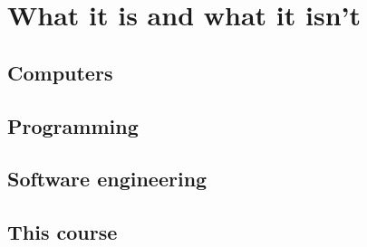  

\chapter{What it is and what it isn't}

	\section{Computers}

	\section{Programming}

	\section{Software engineering}

	\section{This course}
